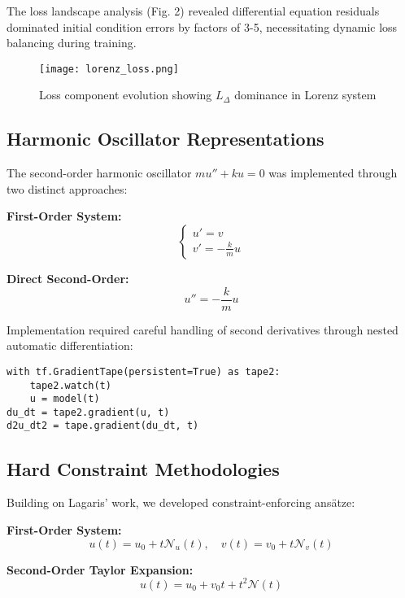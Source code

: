 \documentclass{article}
\begin{document}
The loss landscape analysis (Fig. 2) revealed differential equation residuals dominated initial condition errors by factors of 3-5, necessitating dynamic loss balancing during training.

\begin{figure}[h]
\centering
\texttt{[image: lorenz\_loss.png]}
\caption{Loss component evolution showing $L_\Delta$ dominance in Lorenz system}
\end{figure}

\subsection{Harmonic Oscillator Representations}
The second-order harmonic oscillator $mu'' + ku = 0$ was implemented through two distinct approaches:

\textbf{First-Order System:}
\begin{equation*}
\begin{cases}
u' = v \\
v' = -\frac{k}{m}u 
\end{cases}
\end{equation*}

\textbf{Direct Second-Order:}
\begin{equation*}
u'' = -\frac{k}{m}u
\end{equation*}

Implementation required careful handling of second derivatives through nested automatic differentiation:

\begin{verbatim}
with tf.GradientTape(persistent=True) as tape2:
    tape2.watch(t)
    u = model(t)
du_dt = tape2.gradient(u, t)
d2u_dt2 = tape.gradient(du_dt, t)
\end{verbatim}

\subsection{Hard Constraint Methodologies}
Building on Lagaris' work, we developed constraint-enforcing ansätze:

\textbf{First-Order System:}
\begin{equation*}
u(t) = u_0 + t\mathcal{N}_u(t), \quad v(t) = v_0 + t\mathcal{N}_v(t)
\end{equation*}

\textbf{Second-Order Taylor Expansion:}
\begin{equation*}
u(t) = u_0 + v_0t + t^2\mathcal{N}(t)
\end{equation*}
\end{document}
